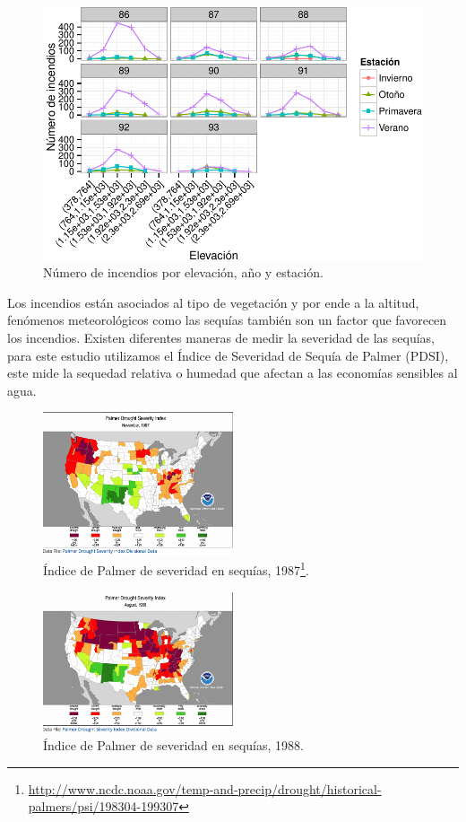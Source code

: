 \documentclass[12,]{article}
\let\rmarkdownfootnote\footnote%
\def\footnote{\protect\rmarkdownfootnote}
\begin{document}
\begin{figure}[htbp]
\centering
\includegraphics{tarea2_files/figure-latex/unnamed-chunk-4-1.pdf}
\caption{Número de incendios por elevación, año y estación.}
\end{figure}

Los incendios están asociados al tipo de vegetación y por ende a la
altitud, fenómenos meteorológicos como las sequías también son un factor
que favorecen los incendios. Existen diferentes maneras de medir la
severidad de las sequías, para este estudio utilizamos el Índice de
Severidad de Sequía de Palmer (PDSI), este mide la sequedad relativa o
humedad que afectan a las economías sensibles al agua.

\begin{figure}[H]
\centering
\includegraphics[width=0.5\textwidth]{imagenes/IP87.png}
\caption{Índice de Palmer de severidad en sequías, 1987\footnote{\url{http://www.ncdc.noaa.gov/temp-and-precip/drought/historical-palmers/psi/198304-199307}}.}

\end{figure}

\begin{figure}[H]
\centering
\includegraphics[width=0.5\textwidth]{imagenes/IP88.png}
\caption{Índice de Palmer de severidad en sequías, 1988.}

\end{figure}
\end{document}
